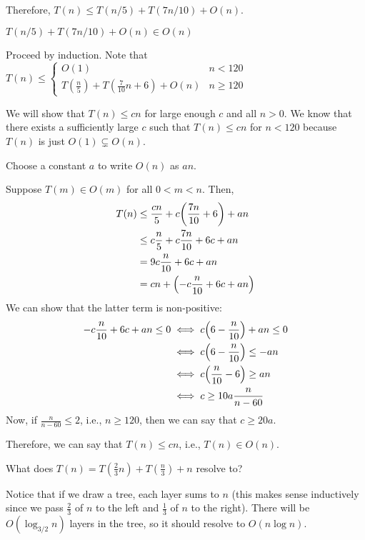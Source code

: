 Therefore, $T(n) \leq T(n/5) + T(7n/10) + O(n)$.


\begin{claim}
  $T(n/5) + T(7n/10) + O(n) \in O(n)$
\end{claim}
\begin{prf}
  Proceed by induction. Note that $T(n) \leq \begin{cases}
      O(1)                                       & n < 120    \\
      T(\frac{n}{5}) + T(\frac{7}{10}n+6) + O(n) & n \geq 120
    \end{cases}$

  We will show that $T(n) \leq cn$ for large enough $c$ and all $n > 0$.
  We know that there exists a sufficiently large $c$ such that
  $T(n) \leq cn$ for $n < 120$ because $T(n)$ is just $O(1) \subsetneq O(n)$.

  Choose a constant $a$ to write $O(n)$ as $an$.

  Suppose $T(m) \in O(m)$ for all $0 < m < n$. Then,
  \begin{align*}
    T(n) & \leq \frac{cn}{5} + c\qty(\frac{7n}{10} + 6) + an \\
         & \leq c\frac{n}{5} + c\frac{7n}{10} + 6c + an      \\
         & = 9c\frac{n}{10} + 6c + an                        \\
         & = cn + \qty(-c\frac{n}{10} + 6c + an)
  \end{align*}
  We can show that the latter term is non-positive:
  \begin{align*}
    -c\frac{n}{10} + 6c + an \leq 0
     & \iff c\qty(6-\frac{n}{10}) + an \leq 0 \\
     & \iff c\qty(6-\frac{n}{10}) \leq -an    \\
     & \iff c\qty(\frac{n}{10}-6) \geq an     \\
     & \iff c \geq 10a\frac{n}{n-60}
  \end{align*}
  Now, if $\frac{n}{n-60} \leq 2$, i.e., $n \geq 120$,
  then we can say that $c \geq 20a$.

  Therefore, we can say that $T(n) \leq cn$, i.e., $T(n) \in O(n)$.
\end{prf}

\begin{example}
  What does $T(n) = T(\frac23n) + T(\frac{n}{3}) + n$ resolve to?
\end{example}
\begin{sol}
  Notice that if we draw a tree, each layer sums to $n$
  (this makes sense inductively since we pass $\frac23$ of $n$ to the left and $\frac13$ of $n$ to the right).
  There will be $O(\log_{3/2}n)$ layers in the tree, so it should resolve to $O(n\log n)$.
\end{sol}
